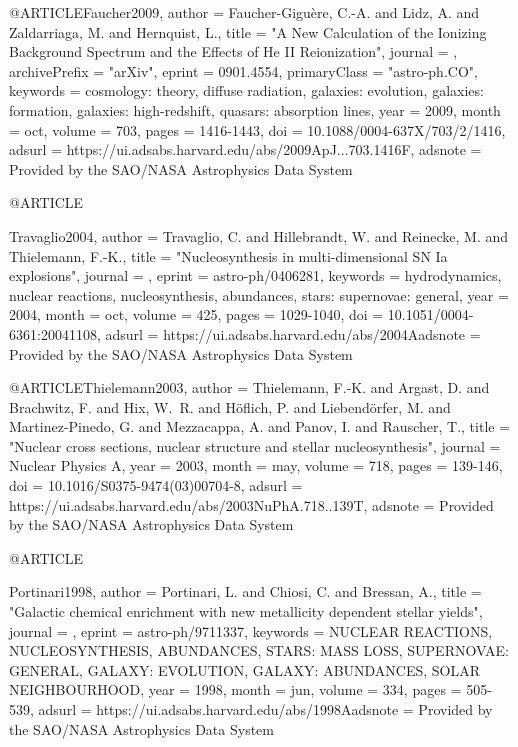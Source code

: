 \documentclass[useAMS,usenatbib]{mnras}
\begin{document}
{{{@ARTICLE{Faucher2009,
   author = {{Faucher-Gigu{\`e}re}, C.-A. and {Lidz}, A. and {Zaldarriaga}, M. and 
	{Hernquist}, L.},
    title = "{A New Calculation of the Ionizing Background Spectrum and the Effects of He II Reionization}",
  journal = {\apj},
archivePrefix = "arXiv",
   eprint = {0901.4554},
 primaryClass = "astro-ph.CO",
 keywords = {cosmology: theory, diffuse radiation, galaxies: evolution, galaxies: formation, galaxies: high-redshift, quasars: absorption lines},
     year = 2009,
    month = oct,
   volume = 703,
    pages = {1416-1443},
      doi = {10.1088/0004-637X/703/2/1416},
   adsurl = {https://ui.adsabs.harvard.edu/abs/2009ApJ...703.1416F},
  adsnote = {Provided by the SAO/NASA Astrophysics Data System}
}

@ARTICLE{Travaglio2004,
   author = {{Travaglio}, C. and {Hillebrandt}, W. and {Reinecke}, M. and 
	{Thielemann}, F.-K.},
    title = "{Nucleosynthesis in multi-dimensional SN Ia explosions}",
  journal = {\aap},
   eprint = {astro-ph/0406281},
 keywords = {hydrodynamics, nuclear reactions, nucleosynthesis, abundances, stars: supernovae: general},
     year = 2004,
    month = oct,
   volume = 425,
    pages = {1029-1040},
      doi = {10.1051/0004-6361:20041108},
   adsurl = {https://ui.adsabs.harvard.edu/abs/2004Aadsnote = {Provided by the SAO/NASA Astrophysics Data System}
}

@ARTICLE{Thielemann2003,
   author = {{Thielemann}, F.-K. and {Argast}, D. and {Brachwitz}, F. and 
	{Hix}, W.~R. and {H{\"o}flich}, P. and {Liebend{\"o}rfer}, M. and 
	{Martinez-Pinedo}, G. and {Mezzacappa}, A. and {Panov}, I. and 
	{Rauscher}, T.},
    title = "{Nuclear cross sections, nuclear structure and stellar nucleosynthesis}",
  journal = {Nuclear Physics A},
     year = 2003,
    month = may,
   volume = 718,
    pages = {139-146},
      doi = {10.1016/S0375-9474(03)00704-8},
   adsurl = {https://ui.adsabs.harvard.edu/abs/2003NuPhA.718..139T},
  adsnote = {Provided by the SAO/NASA Astrophysics Data System}
}

@ARTICLE{Portinari1998,
   author = {{Portinari}, L. and {Chiosi}, C. and {Bressan}, A.},
    title = "{Galactic chemical enrichment with new metallicity dependent stellar yields}",
  journal = {\aap},
   eprint = {astro-ph/9711337},
 keywords = {NUCLEAR REACTIONS, NUCLEOSYNTHESIS, ABUNDANCES, STARS: MASS LOSS, SUPERNOVAE: GENERAL, GALAXY: EVOLUTION, GALAXY: ABUNDANCES, SOLAR NEIGHBOURHOOD},
     year = 1998,
    month = jun,
   volume = 334,
    pages = {505-539},
   adsurl = {https://ui.adsabs.harvard.edu/abs/1998Aadsnote = {Provided by the SAO/NASA Astrophysics Data System}
}

}}}}}
\end{document}
